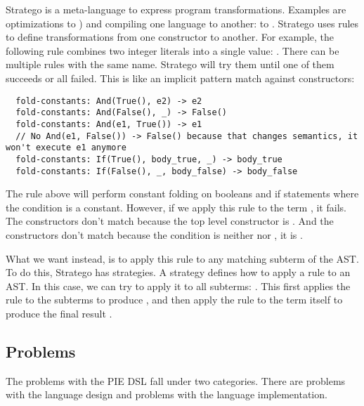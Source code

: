 Stratego is a meta-language to express program transformations.
Examples are optimizations  to ) and compiling one language to another:  to .
Stratego uses rules to define transformations from one constructor to another.
For example, the following rule combines two integer literals into a single value: .
There can be multiple rules with the same name.
Stratego will try them until one of them succeeds or all failed.
This is like an implicit pattern match against constructors:
\begin{lstlisting}
  fold-constants: And(True(), e2) -> e2
  fold-constants: And(False(), _) -> False()
  fold-constants: And(e1, True()) -> e1
  // No And(e1, False()) -> False() because that changes semantics, it won't execute e1 anymore
  fold-constants: If(True(), body_true, _) -> body_true
  fold-constants: If(False(), _, body_false) -> body_false
\end{lstlisting}

The  rule above will perform constant folding on booleans and if statements where the condition is a constant.
However, if we apply this rule to the term , it fails.
The  constructors don't match because the top level constructor is .
And the  constructors don't match because the condition is neither  nor , it is .

What we want instead, is to apply this rule to any matching subterm of the \ac{AST}.
To do this, Stratego has strategies.
A strategy defines how to apply a rule to an AST.
In this case, we can try to apply it to all subterms: .
This first applies the rule to the subterms to produce , and then apply the rule to the term itself to produce the final result .


\subsection{Problems}
\label{subsec:problem_analysis__problems}

The problems with the PIE DSL fall under two categories.
There are problems with the language design and problems with the language implementation.

